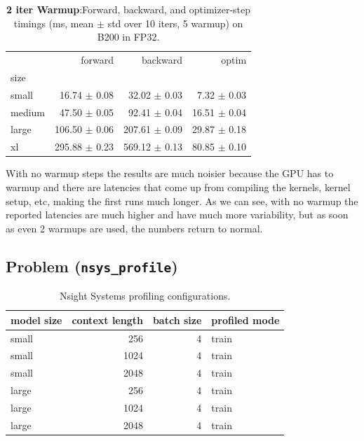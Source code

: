 \documentclass[11pt]{article}
\begin{document}
\begin{table}[H]
\centering
\caption{\textbf{2 iter Warmup}:Forward, backward, and optimizer-step timings (ms, mean $\pm$ std over 10 iters, 5 warmup) on B200 in FP32.}
\label{tab:bench_b}
\begin{tabular}{lrrr}
\toprule
 & forward & backward & optim \\
size &  &  &  \\
\midrule
small & 16.74 $\pm$ 0.08 & 32.02 $\pm$ 0.03 & 7.32 $\pm$ 0.03 \\
medium & 47.50 $\pm$ 0.05 & 92.41 $\pm$ 0.04 & 16.51 $\pm$ 0.04 \\
large & 106.50 $\pm$ 0.06 & 207.61 $\pm$ 0.09 & 29.87 $\pm$ 0.18 \\
xl & 295.88 $\pm$ 0.23 & 569.12 $\pm$ 0.13 & 80.85 $\pm$ 0.10 \\
\bottomrule
\end{tabular}
\end{table}

With no warmup steps the results are much noisier because the GPU has to warmup and there are latencies that come up from compiling the kernels, kernel setup, etc, making the first runs much longer. 
As we can see, with no warmup the reported latencies are much higher and have much more variability, but as soon as even 2 warmups are used, the numbers return to normal.

\vspace{4em}


\subsection{Problem (\texttt{nsys\_profile})}

\begin{table}[H]
\centering
\caption{Nsight Systems profiling configurations.}
\begin{tabular}{lrrl}
\toprule
model size & context length & batch size & profiled mode \\
\midrule
small & 256 & 4 & train \\
small & 1024 & 4 & train \\
small & 2048 & 4 & train \\
large & 256 & 4 & train \\
large & 1024 & 4 & train \\
large & 2048 & 4 & train \\
\bottomrule
\end{tabular}
\end{table}
\end{document}
